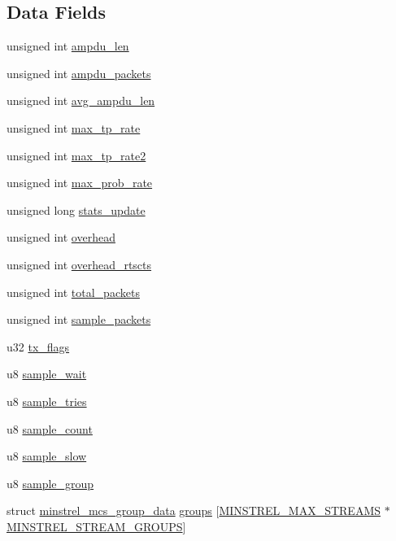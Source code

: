 \subsection*{Data Fields}
\begin{DoxyCompactItemize}
\item 
unsigned int \hyperlink{structminstrel__ht__sta_a81226895623781d8762fd45b25d44ae2}{ampdu\-\_\-len}
\item 
unsigned int \hyperlink{structminstrel__ht__sta_a0cc9c3c7d1f2e54ec3dcf85c128d5d86}{ampdu\-\_\-packets}
\item 
unsigned int \hyperlink{structminstrel__ht__sta_a7615bb62088013811f751b053ca9045d}{avg\-\_\-ampdu\-\_\-len}
\item 
unsigned int \hyperlink{structminstrel__ht__sta_ae61b14461f5cfea710f666fe40906493}{max\-\_\-tp\-\_\-rate}
\item 
unsigned int \hyperlink{structminstrel__ht__sta_aaa4f3e0147c91173f7dd6d86b82ba0ee}{max\-\_\-tp\-\_\-rate2}
\item 
unsigned int \hyperlink{structminstrel__ht__sta_a4a4625871f05851116acae11b392a957}{max\-\_\-prob\-\_\-rate}
\item 
unsigned long \hyperlink{structminstrel__ht__sta_a3c5301bb7fd4073bbad86d50eff8f188}{stats\-\_\-update}
\item 
unsigned int \hyperlink{structminstrel__ht__sta_a0765a78b57d601d73281773e3e0b129d}{overhead}
\item 
unsigned int \hyperlink{structminstrel__ht__sta_afcd824a51bf0fbc50e8d7798d7c9c4eb}{overhead\-\_\-rtscts}
\item 
unsigned int \hyperlink{structminstrel__ht__sta_a6faab394a49c8462592c339de9d60855}{total\-\_\-packets}
\item 
unsigned int \hyperlink{structminstrel__ht__sta_a7a98923c9bfaab59c35970660fe7ef6f}{sample\-\_\-packets}
\item 
u32 \hyperlink{structminstrel__ht__sta_a428012b2ca384e2898d6389025a7b6db}{tx\-\_\-flags}
\item 
u8 \hyperlink{structminstrel__ht__sta_ac908c67104c56185324bcbc21da68959}{sample\-\_\-wait}
\item 
u8 \hyperlink{structminstrel__ht__sta_a0c58b0d161933e7f86d6dada5438ca88}{sample\-\_\-tries}
\item 
u8 \hyperlink{structminstrel__ht__sta_a344a0db2b0250fb750c41b09a5b2c02c}{sample\-\_\-count}
\item 
u8 \hyperlink{structminstrel__ht__sta_a64adb5d8e07f2fe59ee79d6062759a4c}{sample\-\_\-slow}
\item 
u8 \hyperlink{structminstrel__ht__sta_a0d383c66830af0f8410c63cbf3c55273}{sample\-\_\-group}
\item 
struct \hyperlink{structminstrel__mcs__group__data}{minstrel\-\_\-mcs\-\_\-group\-\_\-data} \hyperlink{structminstrel__ht__sta_ae1ef634bc381d48809efc8efdf2757c2}{groups} \mbox{[}\hyperlink{rc80211__minstrel__ht_8h_a158e497cdbf9ea61badd923e095cb3d4}{M\-I\-N\-S\-T\-R\-E\-L\-\_\-\-M\-A\-X\-\_\-\-S\-T\-R\-E\-A\-M\-S} $\ast$\hyperlink{rc80211__minstrel__ht_8h_a392070f099c290936c19a9674a383602}{M\-I\-N\-S\-T\-R\-E\-L\-\_\-\-S\-T\-R\-E\-A\-M\-\_\-\-G\-R\-O\-U\-P\-S}\mbox{]}
\end{DoxyCompactItemize}


